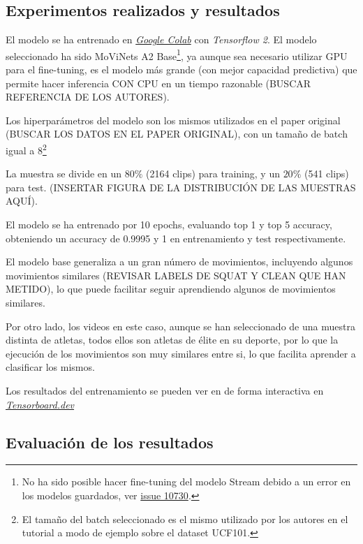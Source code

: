 \subsection{Experimentos realizados y resultados}

El modelo se ha entrenado en \href{https://colab.research.google.com/?hl=es}{\textit{Google Colab}} con \textit{Tensorflow 2}. El modelo seleccionado ha sido MoViNets A2 Base\footnote{No ha sido posible hacer fine-tuning del modelo Stream debido a un error en los modelos guardados, ver \href{https://github.com/tensorflow/models/issues/10730}{issue 10730}.}, ya aunque sea necesario utilizar GPU para el fine-tuning, es el modelo más grande (con mejor capacidad predictiva) que permite hacer inferencia CON CPU en un tiempo razonable (BUSCAR REFERENCIA DE LOS AUTORES).

Los hiperparámetros del modelo son los mismos utilizados en el paper original (BUSCAR LOS DATOS EN EL PAPER ORIGINAL), con un tamaño de batch igual a 8\footnote{El tamaño del batch seleccionado es el mismo utilizado por los autores en el tutorial a modo de ejemplo sobre el dataset UCF101.}

La muestra se divide en un $80\%$ (2164 clips) para training, y un $20\%$ (541 clips) para test. (INSERTAR FIGURA DE LA DISTRIBUCIÓN DE LAS MUESTRAS AQUÍ).

El modelo se ha entrenado por 10 epochs, evaluando top 1 y top 5 accuracy, obteniendo un accuracy de 0.9995 y 1 en entrenamiento y test respectivamente.

El modelo base generaliza a un gran número de movimientos, incluyendo algunos movimientos similares (REVISAR LABELS DE SQUAT Y CLEAN QUE HAN METIDO), lo que puede facilitar seguir aprendiendo algunos de movimientos similares.

Por otro lado, los videos en este caso, aunque se han seleccionado de una muestra distinta de atletas, todos ellos son atletas de élite en su deporte, por lo que la ejecución de los movimientos son muy similares entre si, lo que facilita aprender a clasificar los mismos.

Los resultados del entrenamiento se pueden ver en de forma interactiva en \href{https://tensorboard.dev/experiment/UXyupsnMQ2S74vdul3vdbw/#scalars}{\textit{Tensorboard.dev}}

\subsection{Evaluación de los resultados}

